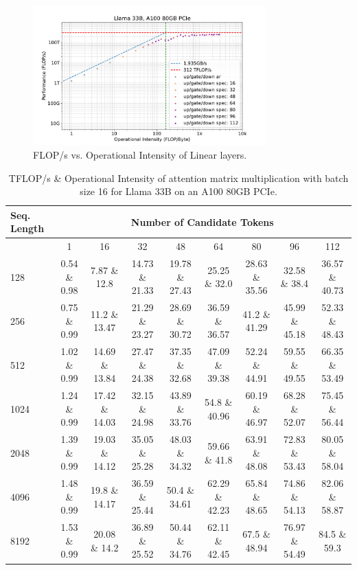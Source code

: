 \documentclass{article}
\theoremstyle{plain}
\theoremstyle{definition}
\theoremstyle{remark}
\begin{document}
\begin{figure}[h]
    \centering
    \includegraphics[width=0.8\textwidth]{llama33b-spec-mlp-bsall.pdf}
    \caption{FLOP/s vs. Operational Intensity of Linear layers.}
    \label{fig:llama33b-spec--mlp-bsall}
\end{figure}

\clearpage


\begin{table}[h]
\centering
\scriptsize
\begin{tabular}{lcccccccc}

\toprule
Seq. Length & \multicolumn{8}{c}{Number of Candidate Tokens} \\
\midrule
 & 1 & 16 & 32 & 48 & 64 & 80 & 96 & 112 \\
\midrule
128  & 0.54 \& 0.98 & 7.87 \& 12.8 & 14.73 \& 21.33 & 19.78 \& 27.43 & 25.25 \& 32.0 & 28.63 \& 35.56 & 32.58 \& 38.4 & 36.57 \& 40.73 \\
256  & 0.75 \& 0.99 & 11.2 \& 13.47 & 21.29 \& 23.27 & 28.69 \& 30.72 & 36.59 \& 36.57 & 41.2 \& 41.29 & 45.99 \& 45.18 & 52.33 \& 48.43 \\
512  & 1.02 \& 0.99 & 14.69 \& 13.84 & 27.47 \& 24.38 & 37.35 \& 32.68 & 47.09 \& 39.38 & 52.24 \& 44.91 & 59.55 \& 49.55 & 66.35 \& 53.49 \\
1024  & 1.24 \& 0.99 & 17.42 \& 14.03 & 32.15 \& 24.98 & 43.89 \& 33.76 & 54.8 \& 40.96 & 60.19 \& 46.97 & 68.28 \& 52.07 & 75.45 \& 56.44 \\
2048 & 1.39 \& 0.99 & 19.03 \& 14.12 & 35.05 \& 25.28 & 48.03 \& 34.32 & 59.66 \& 41.8 & 63.91 \& 48.08 & 72.83 \& 53.43 & 80.05 \& 58.04 \\
4096 & 1.48 \& 0.99 & 19.8 \& 14.17 & 36.59 \& 25.44 & 50.4 \& 34.61 & 62.29 \& 42.23 & 65.84 \& 48.65 & 74.86 \& 54.13 & 82.06 \& 58.87 \\
8192 & 1.53 \& 0.99 & 20.08 \& 14.2 & 36.89 \& 25.52 & 50.44 \& 34.76 & 62.11 \& 42.45 & 67.5 \& 48.94 & 76.97 \& 54.49 & 84.5 \& 59.3 \\
\bottomrule
\end{tabular}
\caption{
TFLOP/s \& Operational Intensity of attention matrix multiplication with batch size 16 for Llama 33B on an A100 80GB PCIe.}
\label{tab:llama33b-spec-bs16}
\end{table}
\end{document}
